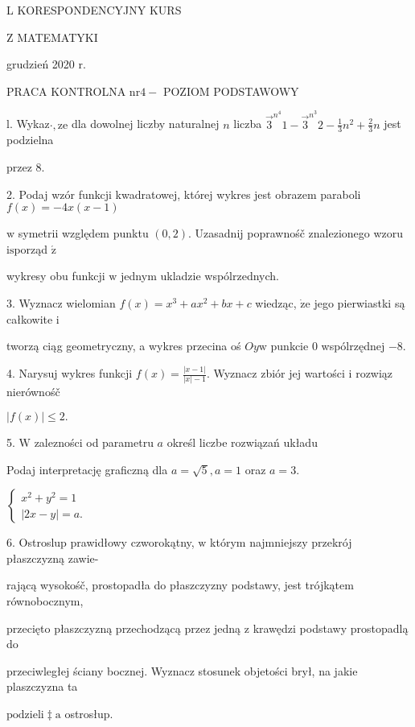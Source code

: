\documentclass[a4paper,12pt]{article}
\begin{document}
L KORESPONDENCYJNY KURS

Z MATEMATYKI

grudzień 2020 r.

PRACA KONTROLNA $\mathrm{n}\mathrm{r} 4-$ POZIOM PODSTAWOWY

l. Wykaz$\cdot, \mathrm{z}\mathrm{e}$ dla dowolnej liczby naturalnej $n$ liczba $\displaystyle \vec{3}^{n^{4}}1-\vec{3}^{n^{3}}2-\frac{1}{3}n^{2}+\frac{2}{3}n$ jest podzielna

przez 8.

2. Podaj wzór funkcji kwadratowej, której wykres jest obrazem paraboli $f(x)=-4x(x-1)$

$\mathrm{w}$ symetrii względem punktu $(0,2)$. Uzasadnij poprawnośč znalezionego wzoru $\mathrm{i}\mathrm{s}$porząd $\acute{\mathrm{z}}$

wykresy obu funkcji $\mathrm{w}$ jednym ukladzie wspólrzednych.

3. Wyznacz wielomian $f(x)=x^{3}+ax^{2}+bx+c$ wiedząc, $\dot{\mathrm{z}}\mathrm{e}$ jego pierwiastki są całkowite $\mathrm{i}$

tworzą ciąg geometryczny, a wykres przecina oś $Oy\mathrm{w}$ punkcie $0$ wspólrzędnej $-8.$

4. Narysuj wykres funkcji $f(x)=\displaystyle \frac{|x-1|}{|x|-1}$. Wyznacz zbiór jej wartości $\mathrm{i}$ rozwiąz nierównośč

$|f(x)|\leq 2.$

5. $\mathrm{W}$ zalezności od parametru $a$ określ liczbe rozwiązań układu

Podaj interpretację graficzną dla $a=\sqrt{5}, a=1$ oraz $a=3.$

$\left\{\begin{array}{l}
x^{2}+y^{2}=1\\
|2x-y|=a.
\end{array}\right.$

6. Ostroslup prawidłowy czworokątny, $\mathrm{w}$ którym najmniejszy przekrój płaszczyzną zawie-

rającą wysokośč, prostopadła do płaszczyzny podstawy, jest trójkątem równobocznym,

przecięto płaszczyzną przechodzącą przez jedną $\mathrm{z}$ krawędzi podstawy prostopadlą do

przeciwległej ściany bocznej. Wyznacz stosunek objetości brył, na jakie plaszczyzna ta

$\mathrm{p}\mathrm{o}\mathrm{d}\mathrm{z}\mathrm{i}\mathrm{e}\mathrm{l}\mathrm{i}\ddagger \mathrm{a}$ ostrosłup.
\end{document}

